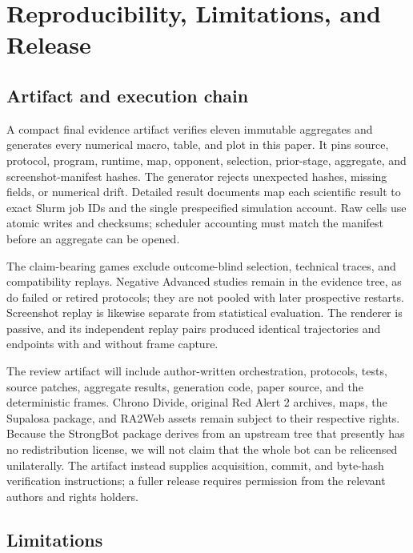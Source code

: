 \section{Reproducibility, Limitations, and Release}
\label{sec:limitations}

\subsection{Artifact and execution chain}

A compact final evidence artifact verifies eleven immutable aggregates and
generates every numerical macro, table, and plot in this paper. It pins source,
protocol, program, runtime, map, opponent, selection, prior-stage, aggregate,
and screenshot-manifest hashes. The generator rejects unexpected hashes,
missing fields, or numerical drift. Detailed result documents map each
scientific result to exact Slurm job IDs and the single prespecified simulation account. Raw cells use atomic writes
and checksums; scheduler
accounting must match the manifest before an aggregate can be opened.

The \OutcomeGameCount{} claim-bearing games exclude outcome-blind selection,
technical traces, and compatibility replays. Negative Advanced studies remain
in the evidence tree, as do failed or retired protocols; they are not pooled
with later prospective restarts. Screenshot replay is likewise separate from
statistical evaluation. The renderer is passive, and its
\ReplayCount{} independent replay pairs produced identical trajectories and
endpoints with and without frame capture.

The review artifact will include author-written orchestration, protocols,
tests, source patches, aggregate results, generation code, paper source, and
the \FrameCount{} deterministic frames. Chrono Divide, original Red Alert 2
archives, maps, the Supalosa package, and RA2Web assets remain subject to their
respective rights. Because the StrongBot package derives from an upstream tree
that presently has no redistribution license, we will not claim that the whole
bot can be relicensed unilaterally. The artifact instead supplies acquisition,
commit, and byte-hash verification instructions; a fuller release requires
permission from the relevant authors and rights holders.

\subsection{Limitations}

